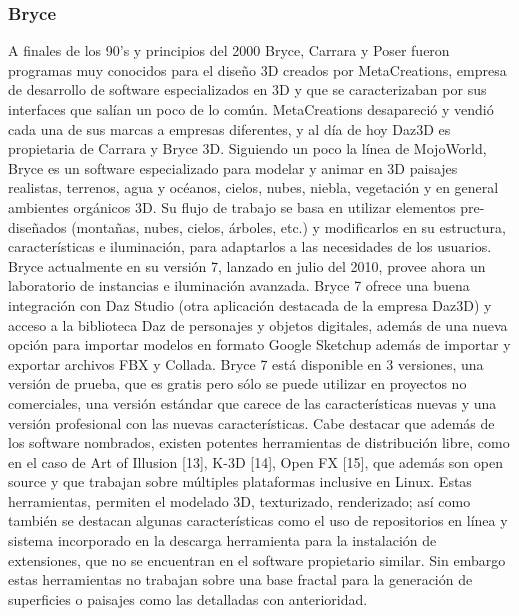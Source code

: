\documentclass[12pt]{article} %
\begin{document}
\subsubsection{Bryce}
A finales de los 90's y principios del 2000 Bryce, Carrara y Poser fueron programas muy conocidos para el diseño 3D creados por MetaCreations, empresa de desarrollo de software especializados en 3D y que se caracterizaban por sus interfaces que salían un poco de lo común. MetaCreations desapareció y vendió cada una de sus marcas a empresas diferentes, y al día de hoy Daz3D es propietaria de Carrara y Bryce 3D.
Siguiendo un poco la línea de MojoWorld, Bryce es un software especializado para modelar y animar en 3D paisajes realistas, terrenos, agua y océanos, cielos, nubes, niebla, vegetación y en general ambientes orgánicos 3D. Su flujo de trabajo se basa en utilizar elementos pre-diseñados (montañas, nubes, cielos, árboles, etc.) y modificarlos en su estructura, características e iluminación, para adaptarlos a las necesidades de los usuarios. Bryce actualmente en su versión 7, lanzado en julio del 2010, provee ahora un laboratorio de instancias e iluminación avanzada. Bryce 7 ofrece una buena integración con Daz Studio (otra aplicación destacada de la empresa Daz3D) y acceso a la biblioteca Daz de personajes y objetos digitales, además de una nueva opción para importar modelos en formato Google Sketchup además de importar y exportar archivos FBX y Collada. Bryce 7 está disponible en 3 versiones, una versión de prueba, que es gratis pero sólo se puede utilizar en proyectos no comerciales, una versión estándar que carece de las características nuevas y una versión profesional con las nuevas características.
Cabe destacar que además de los software nombrados, existen potentes herramientas de distribución libre, como en el caso de Art of Illusion [13], K-3D [14], Open FX [15], que además son open source y que trabajan sobre múltiples plataformas inclusive en Linux. Estas herramientas,  permiten el modelado 3D, texturizado, renderizado; así como también se destacan algunas características como el uso de repositorios en línea y sistema incorporado en la descarga herramienta para la instalación de extensiones, que no se encuentran en el software propietario similar. Sin embargo estas herramientas no trabajan sobre una base fractal para la generación de superficies o paisajes como las detalladas con anterioridad.
\end{document}
